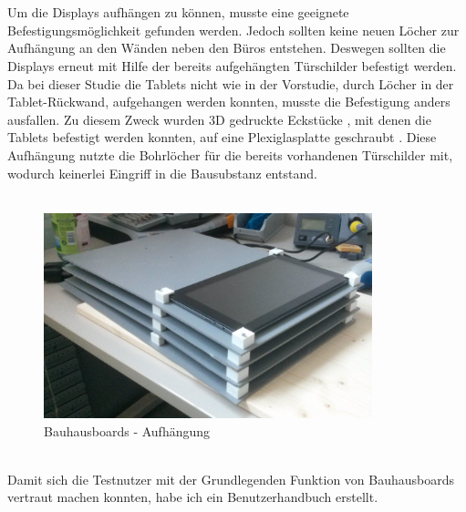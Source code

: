 \\
\\
Um die Displays aufhängen zu können, musste eine geeignete Befestigungsmöglichkeit gefunden werden.
Jedoch sollten keine neuen Löcher zur Aufhängung an den Wänden neben den Büros entstehen.
Deswegen sollten die Displays erneut mit Hilfe der bereits aufgehängten Türschilder befestigt werden.
Da bei dieser Studie die Tablets nicht wie in der Vorstudie, durch Löcher in der Tablet-Rückwand, aufgehangen werden konnten, musste die Befestigung anders ausfallen.
Zu diesem Zweck wurden 3D gedruckte Eckstücke , mit denen die Tablets befestigt werden konnten, auf eine Plexiglasplatte geschraubt .
Diese Aufhängung nutzte die Bohrlöcher für die bereits vorhandenen Türschilder mit, wodurch keinerlei Eingriff in die Bausubstanz entstand.
\\\\
\begin{figure}%
  \centering
    \includegraphics[width=0.85\textwidth]{./img/fertigeAufhaengung.png}
  \caption{Bauhausboards - Aufhängung}
  \label{img:fertigeAufhaengung}
\end{figure}
\\
Damit sich die Testnutzer mit der Grundlegenden Funktion von Bauhausboards vertraut machen konnten, habe ich ein Benutzerhandbuch erstellt.

